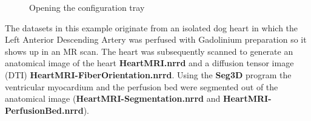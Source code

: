 \documentclass[fleqn,11pt,openany]{book}
\begin{document}
\begin{figure}
\caption{Opening the configuration tray}\label{fig:ViewerOptions}
\end{figure}

The datasets in this example originate from an isolated dog heart in which the Left Anterior Descending Artery was perfused with Gadolinium preparation so it shows up in an MR scan. The  heart was subsequently scanned to generate an anatomical image of the heart  {\bf HeartMRI.nrrd} and a diffusion tensor image (DTI) {\bf HeartMRI-FiberOrientation.nrrd}. Using the {\bf Seg3D} program the ventricular myocardium and the perfusion bed were segmented out of the anatomical image ({\bf HeartMRI-Segmentation.nrrd} and {\bf HeartMRI-PerfusionBed.nrrd}).
\end{document}
